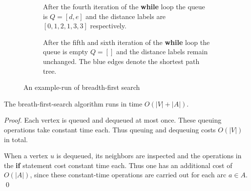 \begin{figure}
\begin{subfigure}[t]{0.45\textwidth}
\caption{{After the fourth iteration of the {\bf while} loop the queue
 is $Q = [d,e]$ and the distance labels are  $[0,1,2,1,3,3]$ respectively. }}
\end{subfigure}
\hfill 
\begin{subfigure}[t]{0.45\textwidth}
\caption{After the fifth and sixth iteration of the {\bf while} loop 
 the queue is empty $Q = []$ and the distance labels remain unchanged. 
 The blue edges denote the shortest path tree.}
\end{subfigure}
  


\caption{An example-run of breadth-first search}\label{g:fig:4}
\end{figure}





\begin{theorem}
  \label{f:thr:26}
  The breath-first-search algorithm runs in time $O( |V| + |A|)$. 
\end{theorem}

\begin{proof}
  Each vertex is queued and dequeued at most once. These queuing
  operations take constant time each. Thus queuing and dequeuing costs
  $O( |V| )$ in total. 

  When a vertex $u$ is dequeued, its neighbors are
  inspected and the operations in the {\bf if} statement cost constant
  time each. Thus one has an additional cost of $O( |A | )$, since
  these constant-time  operations are carried out for each arc $a \in
  A$. 
  \qed
\end{proof}

